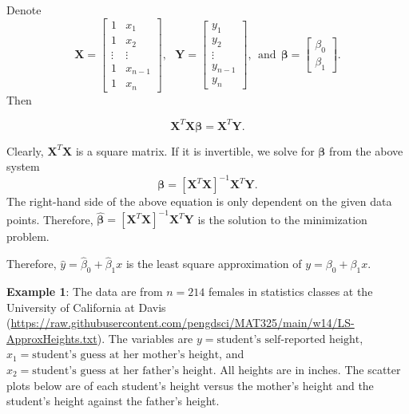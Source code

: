\documentclass[
]{book}
\begin{document}
Denote
\[
\mathbf{X} =
\left[
\begin{array}{cc}
 1 & x_1 \\
 1 & x_2 \\
 \vdots & \vdots \\
 1 & x_{n-1} \\
 1 & x_n
\end{array}
\right],
~~~
\mathbf{Y} =
\left[
\begin{array}{c}
y_1 \\
y_2\\
\vdots\\
y_{n-1}\\
y_n
\end{array}
\right],
~~\text{and}~~
\mathbf{\beta} =
\left[
\begin{array}{c}
\beta_0 \\
\beta_1
\end{array}
\right].
\]
Then

\[
\mathbf{X}^T \mathbf{X} \mathbf{\beta} = \mathbf{X}^T\mathbf{Y}.
\]

Clearly, \(\mathbf{X}^T \mathbf{X}\) is a square matrix. If it is invertible, we solve for \(\mathbf{\beta}\) from the above system
\[
\mathbf{\beta} = [\mathbf{X}^T \mathbf{X}]^{-1} \mathbf{X}^T\mathbf{Y}.
\]
The right-hand side of the above equation is only dependent on the given data points. Therefore, \(\mathbf{\hat{\beta}} = [\mathbf{X}^T \mathbf{X}]^{-1} \mathbf{X}^T\mathbf{Y}\) is the solution to the minimization problem.

Therefore, \(\hat{y} = \hat{\beta}_0 + \hat{\beta}_1 x\) is the least square approximation of \(y = \beta_0 + \beta_1 x\).

\hfill\break

\textbf{Example 1}: The data are from \(n = 214\) females in statistics classes at the University of California at Davis (\url{https://raw.githubusercontent.com/pengdsci/MAT325/main/w14/LS-ApproxHeights.txt}). The variables are \(y = \text{student’s self-reported height}\), \(x_1 = \text{student’s guess at her mother’s height}\), and \(x_2 = \text{student’s guess at her father’s height}\). All heights are in inches. The scatter plots below are of each student's height versus the mother's height and the student's height against the father's height.
\end{document}
